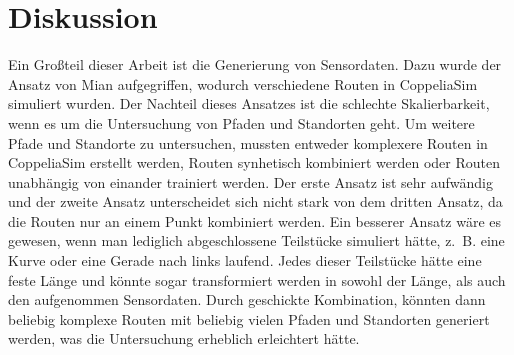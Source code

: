 \chapter{Diskussion}
Ein Großteil dieser Arbeit ist die Generierung von Sensordaten.
Dazu wurde der Ansatz von Mian aufgegriffen, wodurch verschiedene Routen in CoppeliaSim simuliert wurden.
Der Nachteil dieses Ansatzes ist die schlechte Skalierbarkeit, wenn es um die Untersuchung von Pfaden und Standorten geht.
Um weitere Pfade und Standorte zu untersuchen, mussten entweder komplexere Routen in CoppeliaSim erstellt werden,
Routen synhetisch kombiniert werden oder Routen unabhängig von einander trainiert werden.
\newline
\newline
Der erste Ansatz ist sehr aufwändig und der zweite Ansatz unterscheidet sich nicht stark von dem dritten Ansatz,
da die Routen nur an einem Punkt kombiniert werden.
Ein besserer Ansatz wäre es gewesen, wenn man lediglich abgeschlossene Teilstücke simuliert hätte,
z.~B. eine Kurve oder eine Gerade nach links laufend.
Jedes dieser Teilstücke hätte eine feste Länge und könnte sogar transformiert werden in sowohl der Länge, als auch den aufgenommen Sensordaten.
Durch geschickte Kombination, könnten dann beliebig komplexe Routen mit beliebig vielen Pfaden und Standorten generiert werden,
was die Untersuchung erheblich erleichtert hätte.
